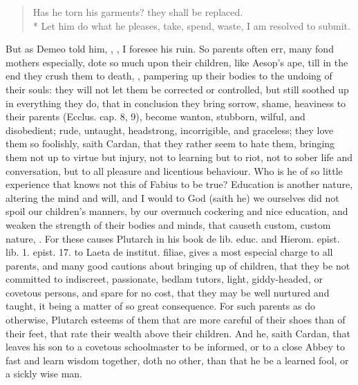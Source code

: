 {\begin{verse}
Has he torn his garments? they shall be replaced.\\*
Let him do what he pleases, take, spend, waste, I am resolved to submit.
\end{verse}
%
But as Demeo told him, ,
, I foresee his ruin. So parents often err, many fond
mothers especially, dote so much upon their children, like
Aesop's ape, till in the end they crush them to death, , pampering up their bodies to the undoing of
their souls: they will not let them be corrected or controlled,
but still soothed up in everything they do, that in conclusion they
bring sorrow, shame, heaviness to their parents (Ecclus. cap.  8,
9), become wanton, stubborn, wilful, and disobedient; rude, untaught,
headstrong, incorrigible, and graceless; they love them so foolishly,
saith Cardan, that they rather seem to hate them, bringing them
not up to virtue but injury, not to learning but to riot, not to sober
life and conversation, but to all pleasure and licentious behaviour.
Who is he of so little experience that knows not this of Fabius to be
true? Education is another nature, altering the mind and will,
and I would to God (saith he) we ourselves did not spoil our children's
manners, by our overmuch cockering and nice education, and weaken the
strength of their bodies and minds, that causeth custom, custom nature,
\etc{}. For these causes Plutarch in his book de lib. educ. and Hierom.
epist. lib. 1. epist. 17. to Laeta de institut. filiae, gives a most
especial charge to all parents, and many good cautions about bringing
up of children, that they be not committed to indiscreet, passionate,
bedlam tutors, light, giddy-headed, or covetous persons, and spare for
no cost, that they may be well nurtured and taught, it being a matter
of so great consequence. For such parents as do otherwise, Plutarch
esteems of them that are more careful of their shoes than of
their feet, that rate their wealth above their children. And he, saith
Cardan, that leaves his son to a covetous schoolmaster to be
informed, or to a close Abbey to fast and learn wisdom together, doth
no other, than that he be a learned fool, or a sickly wise man.

}
